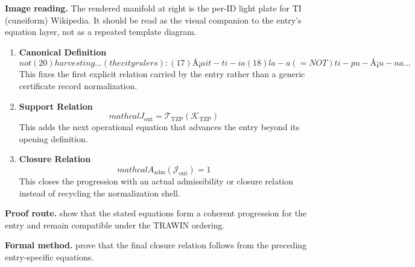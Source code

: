 \begin{samepage}
\noindent\begin{minipage}[t]{0.45\linewidth}
\vspace{0pt}
\raggedright
\scriptsize\textbf{Image reading.} The rendered manifold at right is the per-ID light plate for TI (cuneiform) Wikipedia. It should be read as the visual companion to the entry's equation layer, not as a repeated template diagram.\par
\end{minipage}\hfill
\begin{minipage}[t]{0.53\linewidth}
\vspace*{-0.10in}
\raggedright
{}
\end{minipage}
\end{samepage}

\clearpage


\begin{enumerate}[leftmargin=1.6em,itemsep=9pt,topsep=6pt]
\item \textbf{Canonical Definition}
\[
not (20) harvesting... (the city rulers): (17) Å¡a it- ti -ia (18) la-a(= NOT ) ti -pu-Å¡u-na...
\]
This fixes the first explicit relation carried by the entry rather than a generic certificate record normalization.

\item \textbf{Support Relation}
\[
mathcal{J}_{\mathrm{out}} = \mathcal{T}_{\mathrm{TZP}}\!\left(\mathcal{K}_{\mathrm{TZP}}\right)
\]
This adds the next operational equation that advances the entry beyond its opening definition.

\item \textbf{Closure Relation}
\[
mathcal{A}_{\mathrm{adm}}\!\left(\mathcal{J}_{\mathrm{out}}\right)=1
\]
This closes the progression with an actual admissibility or closure relation instead of recycling the normalization shell.
\end{enumerate}

\textbf{Proof route.} show that the stated equations form a coherent progression for the entry and remain compatible under the TRAWIN ordering.

\textbf{Formal method.} prove that the final closure relation follows from the preceding entry-specific equations.

\medskip
{}

